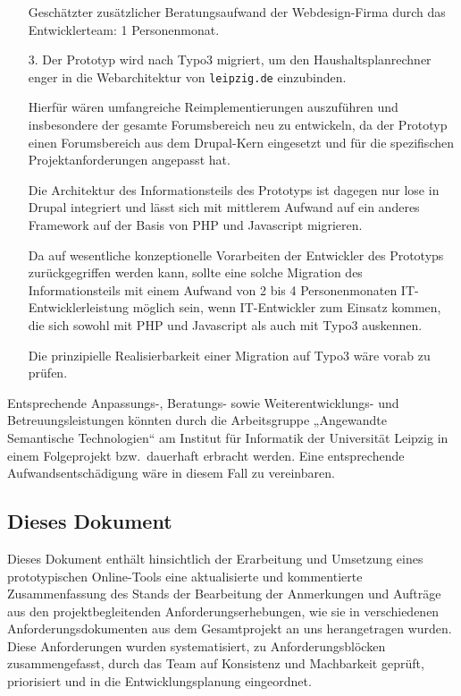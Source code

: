 \documentclass[11pt,a4paper,twoside]{article}
\begin{document}
\begin{itemize}
  Geschätzter zusätzlicher Beratungsaufwand der Webdesign-Firma durch das
  Entwicklerteam: 1 Personenmonat.
\item [3.] Der Prototyp wird nach Typo3 migriert, um den Haushaltsplanrechner
  enger in die Webarchitektur von \texttt{leipzig.de} einzubinden.

  Hierfür wären umfangreiche Reimplementierungen auszuführen und insbesondere
  der gesamte Forumsbereich neu zu entwickeln, da der Prototyp einen
  Forumsbereich aus dem Drupal-Kern eingesetzt und für die spezifischen
  Projektanforderungen angepasst hat.

  Die Architektur des Informationsteils des Prototyps ist dagegen nur lose in
  Drupal integriert und lässt sich mit mittlerem Aufwand auf ein anderes
  Framework auf der Basis von PHP und Javascript migrieren. 

  Da auf wesentliche konzeptionelle Vorarbeiten der Entwickler des Prototyps
  zurückgegriffen werden kann, sollte eine solche Migration des
  Informationsteils mit einem Aufwand von 2 bis 4 Personenmonaten
  IT-Entwicklerleistung möglich sein, wenn IT-Entwickler zum Einsatz kommen,
  die sich sowohl mit PHP und Javascript als auch mit Typo3 auskennen.  

  Die prinzipielle Realisierbarkeit einer Migration auf Typo3 wäre vorab zu
  prüfen. 
\end{itemize}
Entsprechende Anpassungs-, Beratungs- sowie Weiterentwicklungs- und
Betreuungsleistungen könnten durch die Arbeitsgruppe „Angewandte Semantische
Technologien“ am Institut für Informatik der Universität Leipzig in einem
Folgeprojekt bzw.\ dauerhaft erbracht werden. Eine entsprechende
Aufwandsentschädigung wäre in diesem Fall zu vereinbaren.

\subsection{Dieses Dokument} 

Dieses Dokument enthält hinsichtlich der Erarbeitung und Umsetzung eines
prototypischen Online-Tools eine aktualisierte und kommentierte
Zusammenfassung des Stands der Bearbeitung der Anmerkungen und Aufträge aus
den projektbegleitenden Anforderungserhebungen, wie sie in verschiedenen
Anforderungsdokumenten aus dem Gesamtprojekt an uns herangetragen wurden.
Diese Anforderungen wurden systematisiert, zu Anforderungsblöcken
zusammengefasst, durch das Team auf Konsistenz und Machbarkeit geprüft,
priorisiert und in die Entwicklungsplanung eingeordnet.
\end{document}
